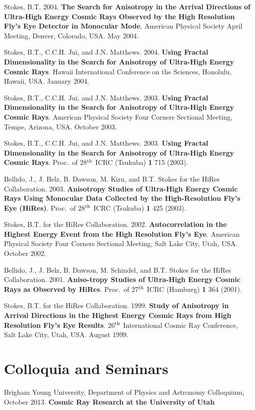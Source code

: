 \begin{resume}
Stokes, B.T.  2004.  {\bf The Search for Anisotropy in the Arrival 
Directions of Ultra-High Energy Cosmic Rays Observed by the High Resolution 
Fly's Eye Detector in Monocular Mode}. 
American Physical Society April Meeting, Denver, Colorado, USA.
May 2004.

Stokes, B.T., C.C.H. Jui, and J.N. Matthews.  2004.  {\bf Using Fractal 
Dimensionality in the Search for Anisotropy of Ultra-High Energy Cosmic Rays}. 
Hawaii International Conference on the Sciences, Honolulu, Hawaii, USA.
January 2004.

Stokes, B.T., C.C.H. Jui, and J.N. Matthews.  2003.  {\bf Using Fractal 
Dimensionality in the Search for Anisotropy of Ultra-High Energy Cosmic Rays}. 
American Physical Society Four Corners Sectional Meeting, Tempe, Arizona, USA.
October 2003.

Stokes, B.T., C.C.H. Jui, and J.N. Matthews.  2003.  {\bf Using Fractal 
Dimensionality in the Search for Anisotropy of Ultra-High Energy Cosmic Rays}. 
Proc.\ of 28$^{\rm th}$ ICRC (Tsukuba) {\bf 1} 715 (2003).

Bellido, J., J. Belz, B. Dawson, M. Kirn, and  B.T. Stokes for the HiRes
Collaboration.  2003.  {\bf Anisotropy Studies of Ultra-High Energy Cosmic 
Rays Using Monocular Data Collected by the High-Resolution Fly's Eye (HiRes)}.
 Proc.\ of 28$^{\rm th}$ ICRC (Tsukuba) {\bf 1} 425 (2003).

Stokes, B.T. for the HiRes Collaboration.  2002.  {\bf Autocorrelation in the 
Highest Energy Event from the High Resolution Fly's Eye}.  American Physical
Society Four Corners Sectional Meeting, Salt Lake City, Utah, USA.  October
2002.   

Bellido, J., J. Belz, B. Dawson, M. Schindel, and B.T. Stokes for the HiRes
Collaboration.  2001.  {\bf Aniso-tropy Studies of Ultra-High Energy Cosmic 
Rays as Observed by HiRes}.  Proc.\ of 27$^{\rm th}$ ICRC (Hamburg) {\bf 1} 364
(2001).

Stokes, B.T. for the HiRes Collaboration.  1999.   {\bf Study of Anisotropy in 
Arrival Directions in the Highest Energy Cosmic Rays from High Resolution Fly's
Eye Results}.  26$^{\rm th}$ International Cosmic Ray Conference, Salt Lake 
City, Utah, USA. August 1999.

\section{\sc Colloquia and Seminars}

Brigham Young University, Department of Physics and Astronomy Colloquium,
October 2013. {\bf Cosmic Ray Research at the University of Utah}


\end{resume}
